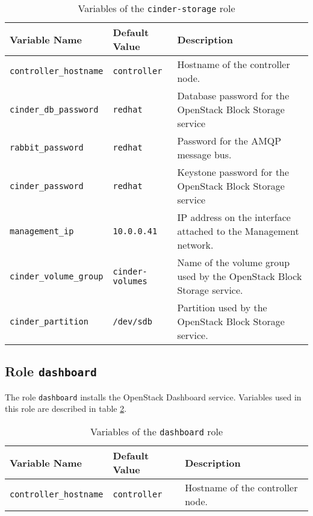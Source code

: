 \begin{table}[!h]
  \centering
  \begin{tabular}{|l|l|p{5cm}|}\hline
    Variable Name & Default Value & Description \\\hline
    \texttt{controller\_hostname} & \texttt{controller} & Hostname of the controller node. \\\hline
    \texttt{cinder\_db\_password} & \texttt{redhat} & Database password for the OpenStack Block Storage service \\\hline
    \texttt{rabbit\_password} & \texttt{redhat} & Password for the AMQP message bus. \\\hline
    \texttt{cinder\_password} & \texttt{redhat} & Keystone password for the OpenStack Block Storage service \\\hline

    \texttt{management\_ip} & \texttt{10.0.0.41} & IP address on the interface attached to the Management network. \\\hline
    \texttt{cinder\_volume\_group} & \texttt{cinder-volumes} & Name of the volume group used by the OpenStack Block Storage service. \\\hline
    \texttt{cinder\_partition} & \texttt{/dev/sdb} & Partition used by the OpenStack Block Storage service. \\\hline
  \end{tabular}
\caption{Variables of the \texttt{cinder-storage} role}
\label{table-cinder-storage}
\end{table}

\subsection{Role \texttt{dashboard}}

The role \texttt{dashboard} installs the OpenStack Dashboard service. Variables used in this role are described in table \ref{table-dashboard}.

\begin{table}[!h]
  \centering
  \begin{tabular}{|l|l|p{5cm}|}\hline
    Variable Name & Default Value & Description \\\hline
    \texttt{controller\_hostname} & \texttt{controller} & Hostname of the controller node. \\\hline
  \end{tabular}
\caption{Variables of the \texttt{dashboard} role}
\label{table-dashboard}
\end{table}



